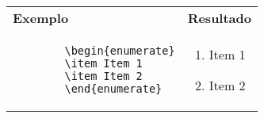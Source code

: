 \begin{quadro}[!htb]
    \centering
    \begin{tabular}{p{7.5cm}|p{7.5cm}}
        \textbf{Exemplo} & \textbf{Resultado} \\
        
        \begin{verbatim}
        \begin{enumerate}
        \item Item 1
        \item Item 2
        \end{enumerate}
        \end{verbatim}
        & 
        \begin{enumerate}
        \item Item 1
        \item Item 2
        \end{enumerate}
        \\
        
    \end{tabular}
\end{quadro}